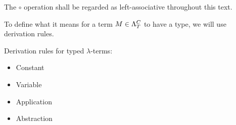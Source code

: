 \documentclass[main.tex]{subfiles}
\begin{document}
The $\circ$ operation shall be regarded as left-associative throughout this
text.

To define what it means for a term $M \in \plambda{T}{C}$ to have a type,
we will use derivation rules.
\begin{defn}
    \label{def:termderiv}
    Derivation rules for typed $\lambda$-terms:
    \begin{itemize}
        \item Constant
        \item Variable
        \item Application
        \item Abstraction
    \end{itemize}
\end{defn}
\end{document}
